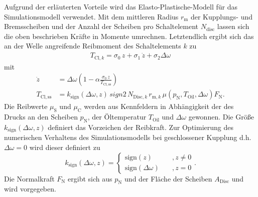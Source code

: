 Aufgrund der erläuterten Vorteile wird das Elasto-Plastische-Modell für das Simulationsmodell verwendet. Mit dem mittleren Radius $r_\mathrm{m}$ der Kupplungs- und Bremsscheiben und der Anzahl der Scheiben pro Schaltelement $N_\mathrm{disc}$  lassen sich die oben beschrieben Kräfte in Momente umrechnen. Letztendlich ergibt sich das an der Welle angreifende Reibmoment des Schaltelements $k$ zu
\begin{align}
T_{\mathrm{Cl},k} = \sigma_0\,z + \sigma_1\,\dot{z} + \sigma_2 \Delta\omega
\end{align}
mit
\begin{align}
\dot{z} &= \Delta \omega \left(1-\alpha\frac{\sigma_0\,z}{T_\mathrm{Cl,ss}}\right)\\
T_\mathrm{Cl,ss} &= k_\mathrm{sign}(\Delta \omega,z)\,sign2\,N_{\mathrm{Disc},k}\,r_{\mathrm{m},k}\,\mu(p_\mathrm{N},T_\mathrm{Oil},\Delta \omega)F_\mathrm{N}.
\end{align}
Die Reibwerte $\mu_\mathrm{S}$ und $\mu_\mathrm{C}$ werden aus Kennfeldern in Abhängigkeit der des Drucks an den Scheiben $p_\mathrm{N}$, der Öltemperatur $T_\mathrm{Oil}$ und $\Delta \omega$ gewonnen. Die Größe $k_\mathrm{sign}(\Delta \omega,z)$ definiert das Vorzeichen der Reibkraft. Zur Optimierung des numerischen Verhaltens des Simulationsmodells bei geschlossener Kupplung d.h. $\Delta \omega = 0$ wird dieser definiert zu 
\begin{equation}
k_\mathrm{sign}(\Delta \omega,z)=\begin{cases} \mathrm{sign}(z)\quad &,z\neq 0\\\mathrm{sign}(\Delta \omega)\quad &,z = 0\end{cases}.
\end{equation}
Die Normalkraft $F_\mathrm{N}$ ergibt sich aus $p_\mathrm{N}$ und der Fläche der Scheiben $A_\mathrm{Disc}$ und wird vorgegeben. 
